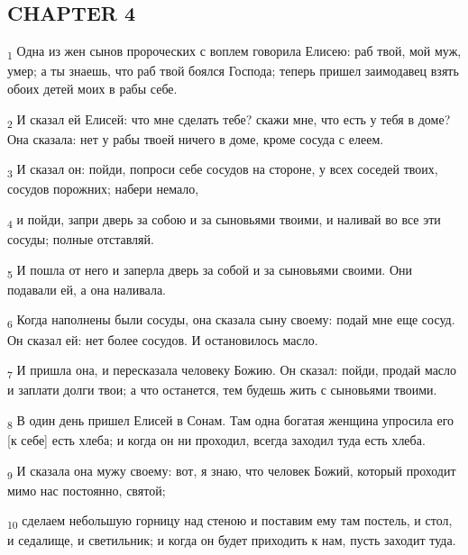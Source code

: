 \subsection{CHAPTER 4}
\begin{tcolorbox}
\textsubscript{1} Одна из жен сынов пророческих с воплем говорила Елисею: раб твой, мой муж, умер; а ты знаешь, что раб твой боялся Господа; теперь пришел заимодавец взять обоих детей моих в рабы себе.
\end{tcolorbox}
\begin{tcolorbox}
\textsubscript{2} И сказал ей Елисей: что мне сделать тебе? скажи мне, что есть у тебя в доме? Она сказала: нет у рабы твоей ничего в доме, кроме сосуда с елеем.
\end{tcolorbox}
\begin{tcolorbox}
\textsubscript{3} И сказал он: пойди, попроси себе сосудов на стороне, у всех соседей твоих, сосудов порожних; набери немало,
\end{tcolorbox}
\begin{tcolorbox}
\textsubscript{4} и пойди, запри дверь за собою и за сыновьями твоими, и наливай во все эти сосуды; полные отставляй.
\end{tcolorbox}
\begin{tcolorbox}
\textsubscript{5} И пошла от него и заперла дверь за собой и за сыновьями своими. Они подавали ей, а она наливала.
\end{tcolorbox}
\begin{tcolorbox}
\textsubscript{6} Когда наполнены были сосуды, она сказала сыну своему: подай мне еще сосуд. Он сказал ей: нет более сосудов. И остановилось масло.
\end{tcolorbox}
\begin{tcolorbox}
\textsubscript{7} И пришла она, и пересказала человеку Божию. Он сказал: пойди, продай масло и заплати долги твои; а что останется, тем будешь жить с сыновьями твоими.
\end{tcolorbox}
\begin{tcolorbox}
\textsubscript{8} В один день пришел Елисей в Сонам. Там одна богатая женщина упросила его [к себе] есть хлеба; и когда он ни проходил, всегда заходил туда есть хлеба.
\end{tcolorbox}
\begin{tcolorbox}
\textsubscript{9} И сказала она мужу своему: вот, я знаю, что человек Божий, который проходит мимо нас постоянно, святой;
\end{tcolorbox}
\begin{tcolorbox}
\textsubscript{10} сделаем небольшую горницу над стеною и поставим ему там постель, и стол, и седалище, и светильник; и когда он будет приходить к нам, пусть заходит туда.
\end{tcolorbox}
